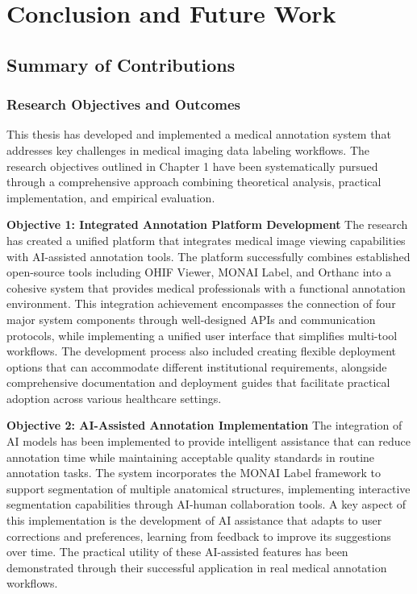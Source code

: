 \chapter{Conclusion and Future Work}

\section{Summary of Contributions}

\subsection{Research Objectives and Outcomes}

This thesis has developed and implemented a medical annotation system that addresses key challenges in medical imaging data labeling workflows. The research objectives outlined in Chapter 1 have been systematically pursued through a comprehensive approach combining theoretical analysis, practical implementation, and empirical evaluation.

\textbf{Objective 1: Integrated Annotation Platform Development}
The research has created a unified platform that integrates medical image viewing capabilities with AI-assisted annotation tools. The platform successfully combines established open-source tools including OHIF Viewer, MONAI Label, and Orthanc into a cohesive system that provides medical professionals with a functional annotation environment. This integration achievement encompasses the connection of four major system components through well-designed APIs and communication protocols, while implementing a unified user interface that simplifies multi-tool workflows. The development process also included creating flexible deployment options that can accommodate different institutional requirements, alongside comprehensive documentation and deployment guides that facilitate practical adoption across various healthcare settings.

\textbf{Objective 2: AI-Assisted Annotation Implementation}
The integration of AI models has been implemented to provide intelligent assistance that can reduce annotation time while maintaining acceptable quality standards in routine annotation tasks. The system incorporates the MONAI Label framework to support segmentation of multiple anatomical structures, implementing interactive segmentation capabilities through AI-human collaboration tools. A key aspect of this implementation is the development of AI assistance that adapts to user corrections and preferences, learning from feedback to improve its suggestions over time. The practical utility of these AI-assisted features has been demonstrated through their successful application in real medical annotation workflows.

